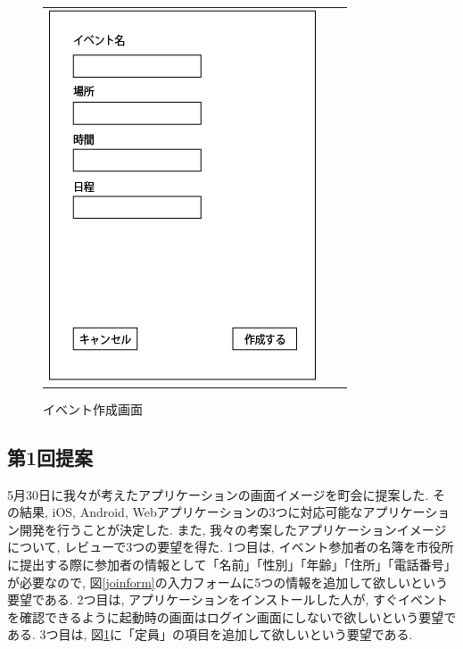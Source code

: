 \begin{figure}[h]
\begin{tabular}{ccc}
\begin{minipage}[t]{0.33\hsize}
        \caption{参加フォーム画面}
        \label{joinform}
      \end{minipage}
      \begin{minipage}[t]{0.33\hsize}
        \centering
        \includegraphics[keepaspectratio, scale=0.4]{process_figures/old_create_event.png}
        \caption{イベント作成画面}
        \label{create_event.old}
      \end{minipage}
    \end{tabular}
\end{figure}

\subsection{第1回提案}
\label{first_review}
5月30日に我々が考えたアプリケーションの画面イメージを町会に提案した.
その結果, iOS, Android, Webアプリケーションの3つに対応可能なアプリケーション開発を行うことが決定した.
また, 我々の考案したアプリケーションイメージについて, レビューで3つの要望を得た.
1つ目は, イベント参加者の名簿を市役所に提出する際に参加者の情報として「名前」「性別」「年齢」「住所」「電話番号」が必要なので,
図\ref{joinform}の入力フォームに5つの情報を追加して欲しいという要望である.
2つ目は, アプリケーションをインストールした人が, すぐイベントを確認できるように起動時の画面はログイン画面にしないで欲しいという要望である.
3つ目は, 図\ref{create_event.old}に「定員」の項目を追加して欲しいという要望である.

